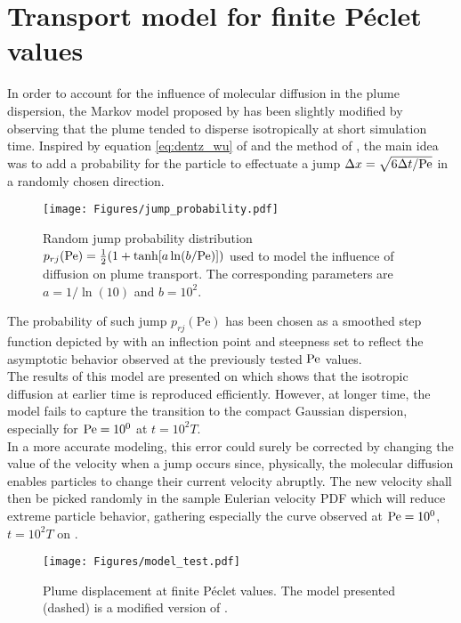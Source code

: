 \section{Transport model for finite Péclet values}
In order to account for the influence of molecular diffusion in the plume dispersion, the Markov model proposed by \citet{Meyer2016} has been slightly modified by observing that the plume tended to disperse isotropically at short simulation time.
Inspired by equation \eqref{eq:dentz_wu} of \citet{Dentz2017} and the method of \citet[Sec. 2.4]{Bijeljic2013}, the main idea was to add a probability for the particle to effectuate a jump $\Delta x=\sqrt{6\Delta t/\mathrm{Pe}}$ in a randomly chosen direction.\\ 
\begin{figure}
	\centering
	\texttt{[image: Figures/jump\_probability.pdf]}
	\caption{Random jump probability distribution $p_{rj}(\mathrm{Pe}) = \frac{1}{2}(1+\tanh[a\ln(b/\mathrm{Pe})])$ used to  model the influence of diffusion on plume transport. The corresponding parameters are $a = 1/\ln(10)$ and $b=10^2$.}
	\label{fig:pj}
\end{figure}
The probability of such jump $p_{rj}(\mathrm{Pe})$ has been chosen as a smoothed step function depicted by  with an inflection point and steepness set to reflect the asymptotic behavior observed at the previously tested $\mathrm{Pe}$ values.\\
The results of this model are presented on  which shows that the isotropic diffusion at earlier time is reproduced efficiently.
However, at longer time, the model fails to capture the transition to the compact Gaussian dispersion, especially for $\mathrm{Pe} = 10^0$ at $t=10^2T$.\\ 
In a more accurate modeling, this error could surely be corrected by changing the value of the velocity when a jump occurs since, physically, the molecular diffusion enables particles to change their current velocity abruptly.
The new velocity shall then be picked randomly in the sample Eulerian velocity PDF which will reduce extreme particle behavior,  gathering especially the curve observed at $\mathrm{Pe} = 10^0$, $t = 10^2 T$ on .
\begin{figure}
	\centering
	\texttt{[image: Figures/model\_test.pdf]}
	\caption{Plume displacement at finite Péclet values. The model presented (dashed) is a modified version of \citet{Meyer2016}.}
	\label{fig:plume_model}
\end{figure}

